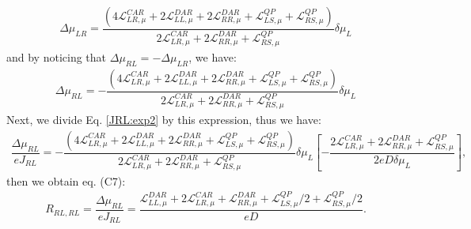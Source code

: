 \begin{align*}
\Delta\mu_{LR}=\dfrac{(4\mathcal{L}_{LR,\mu}^{CAR}+
2\mathcal{L}_{LL,\mu}^{DAR}+
2\mathcal{L}_{RR,\mu}^{DAR}+
\mathcal{L}^{QP}_{LS,\mu}+\mathcal{L}^{QP}_{RS,\mu})}
{2\mathcal{L}_{LR,\mu}^{CAR}
+
2\mathcal{L}_{RR,\mu}^{DAR}
+
\mathcal{L}^{QP}_{RS,\mu}}\delta\mu_{L}
\end{align*}
and by noticing that $\Delta\mu_{RL}=-\Delta\mu_{LR}$, we have:
\begin{align*}
\Delta\mu_{RL}=-\dfrac{(4\mathcal{L}_{LR,\mu}^{CAR}+
2\mathcal{L}_{LL,\mu}^{DAR}+
2\mathcal{L}_{RR,\mu}^{DAR}+
\mathcal{L}^{QP}_{LS,\mu}+\mathcal{L}^{QP}_{RS,\mu})}
{2\mathcal{L}_{LR,\mu}^{CAR}
+
2\mathcal{L}_{RR,\mu}^{DAR}
+
\mathcal{L}^{QP}_{RS,\mu}}\delta\mu_{L}
\end{align*}
Next, we divide Eq. \eqref{JRL:exp2} by this expression, thus we have:
\begin{align*}
\dfrac{\Delta\mu_{RL}}{eJ_{RL}}
=-\dfrac{(4\mathcal{L}_{LR,\mu}^{CAR}+
2\mathcal{L}_{LL,\mu}^{DAR}+
2\mathcal{L}_{RR,\mu}^{DAR}+
\mathcal{L}^{QP}_{LS,\mu}+\mathcal{L}^{QP}_{RS,\mu})}
{2\mathcal{L}_{LR,\mu}^{CAR}
+
2\mathcal{L}_{RR,\mu}^{DAR}
+
\mathcal{L}^{QP}_{RS,\mu}}\delta\mu_{L}
\left[-\dfrac{2\mathcal{L}_{LR,\mu}^{CAR}
+
2\mathcal{L}_{RR,\mu}^{DAR}
+
\mathcal{L}^{QP}_{RS,\mu}}{2eD\delta\mu_{L}}\right],
\end{align*}
then we obtain eq. (C7):
\begin{align}\label{RRLRL:def}
    R_{RL,RL}=\dfrac{\Delta\mu_{RL}}{eJ_{RL}}
=
\dfrac{\mathcal{L}_{LL,\mu}^{DAR}+2\mathcal{L}_{LR,\mu}^{CAR}+
\mathcal{L}_{RR,\mu}^{DAR}+
\mathcal{L}^{QP}_{LS,\mu}/2+\mathcal{L}^{QP}_{RS,\mu}/2}{eD}.
\end{align}
